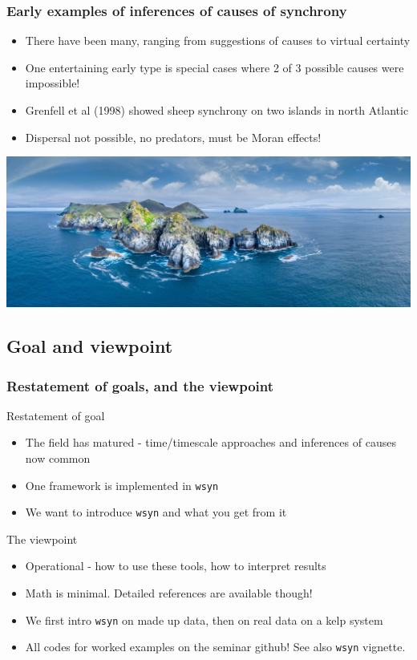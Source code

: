 \documentclass{beamer}
\begin{document}
\begin{frame}
\frametitle{Early examples of inferences of causes of synchrony}
\begin{itemize}
\item There have been many, ranging from suggestions of causes to virtual certainty
\item One entertaining early type is special cases where 2 of 3 possible causes were impossible!
\item Grenfell et al (1998) showed sheep synchrony on two islands in north Atlantic
\item Dispersal not possible, no predators, must be Moran effects!
\end{itemize}
\includegraphics[width=\textwidth]{figures/StKilda.jpg}
\end{frame}

\subsection{Goal and viewpoint}

\begin{frame}
\frametitle{Restatement of goals, and the viewpoint}
\begin{block}{Restatement of goal}
\begin{itemize}
\item The field has matured - time/timescale approaches and inferences of causes now common
\item One framework is implemented in \texttt{wsyn}
\item We want to introduce \texttt{wsyn} and what you get from it
\end{itemize}
\end{block}
\begin{block}{The viewpoint}
\begin{itemize}
\item Operational - how to use these tools, how to interpret results
\item Math is minimal. Detailed references are available though!
\item We first intro \texttt{wsyn} on made up data, then on real data on a kelp system
\item All codes for worked examples on the seminar github! See also \texttt{wsyn} vignette.
\end{itemize}
\end{block}
\end{frame}
\end{document}
